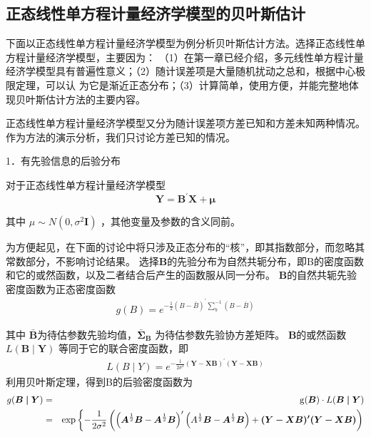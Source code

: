 	\subsection{正态线性单方程计量经济学模型的贝叶斯估计}
		下面以正态线性单方程计量经济学模型为例分析贝叶斯估计方法。选择正态线性单方程计量经济学模型，主要因为：
		（1）在第一章已经介绍，多元线性单方程计量经济学模型具有普遍性意义；（2）随计误差项是大量随机扰动之总和，根据中心极限定理，可以认
		为它是渐近正态分布；（3）计算简单，使用方便，并能完整地体现贝叶斯估计方法的主要内容。
		
		正态线性单方程计量经济学模型又分为随计误差项方差已知和方差未知两种情况。作为方法的演示分析，我们只讨论方差已知的情况。
		
		1．有先验信息的后验分布
		
		对于正态线性单方程计量经济学模型
		\vspace{-0.5em}
		$$ \boldsymbol{ Y = B^{\prime} X + \mu } $$
		
		其中 $ \mu \sim N\left(0, \sigma^{2} \boldsymbol{I} \right) $ ，其他变量及参数的含义同前。
		
		为方便起见，在下面的讨论中将只涉及正态分布的“核”，即其指数部分，而忽略其常数部分，不影响讨论结果。
		选择$ \boldsymbol{B} $的先验分布为自然共轭分布，即B的密度函数和它的或然函数，以及二者结合后产生的函数服从同一分布。
		$\boldsymbol{B} $的自然共轭先验密度函数为正态密度函数
		\begin{eqnarray}
		g(B) =  e^{-\frac{1}{2}(B-\bar{B})^{\prime} \sum_{b}^{-1}(B-\bar{B})}
		\end{eqnarray}
		
		其中 $ \boldsymbol{\bar{B}} $为待估参数先验均值，$ \boldsymbol{\bar{\Sigma}_{B}} $ 为待估参数先验协方差矩阵。
		$ \boldsymbol{B} $的或然函数 $ L(\boldsymbol{B \mid Y}) $ 等同于它的联合密度函数，即
		\begin{eqnarray}
		L(B \mid Y) =  e^{-\frac{1}{2 \sigma^{2}}\boldsymbol{ (Y-X B)^{\prime}(Y-X B) }}
		\label{eq 3.5.4}
		\end{eqnarray}
		利用贝叶斯定理，得到B的后验密度函数为
		\begin{eqnarray}
		g( \boldsymbol{B \mid Y})
		& = & \operatorname{g}(\boldsymbol{B}) \cdot L(\boldsymbol{B \mid Y})  \notag \\ 
		& = & \exp \left\{-\frac{1}{2 \sigma^{2}}\left(\left( \boldsymbol{A} ^{\frac{1}{2}} \boldsymbol{B} -
		\boldsymbol{A}^{\frac{1}{2}} \boldsymbol{B}\right)^{\prime}
			\left(A^{\frac{1}{2}} \boldsymbol{B} -\boldsymbol{A} ^{\frac{1}{2}} \boldsymbol{B} \right)
			+ \boldsymbol{(Y-X B)^{\prime}(Y-X B)}\right)\right.
		\end{eqnarray}
		
